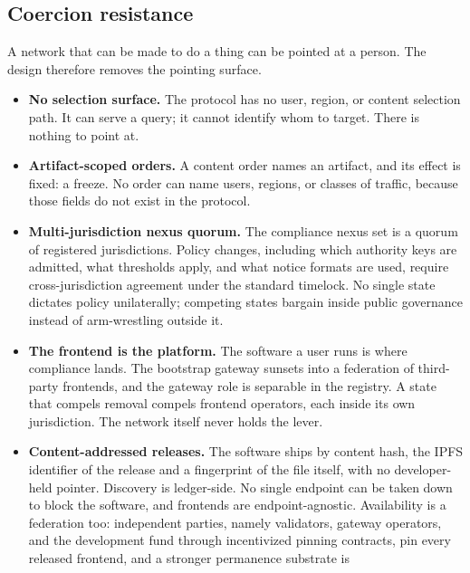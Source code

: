 \documentclass[11pt]{article}
\begin{document}
\subsection{Coercion resistance}

A network that can be made to do a thing can be pointed at a
person. The design therefore removes the pointing surface.

\begin{itemize}
    \item \textbf{No selection surface.} The protocol has no user,
          region, or content selection path. It can serve a query; it
          cannot identify whom to target. There is nothing to point at.
    \item \textbf{Artifact-scoped orders.} A content order names an
          artifact, and its effect is fixed: a freeze. No order can name
          users, regions, or classes of traffic, because those fields do
          not exist in the protocol.
    \item \textbf{Multi-jurisdiction nexus quorum.} The compliance
          nexus set is a quorum of registered jurisdictions. Policy
          changes, including which authority keys are admitted, what
          thresholds apply, and what notice formats are used, require
          cross-jurisdiction agreement under the standard timelock. No single state dictates policy
          unilaterally; competing states bargain inside public governance
          instead of arm-wrestling outside it.
    \item \textbf{The frontend is the platform.} The software a user
          runs is where compliance lands. The bootstrap gateway sunsets
          into a federation of third-party frontends, and the gateway role
          is separable in the registry. A state that compels removal
          compels frontend operators, each inside its own jurisdiction.
          The network itself never holds the lever.
    \item \textbf{Content-addressed releases.} The software ships by
          content hash, the IPFS identifier of the release and a
          fingerprint of the file itself, with no developer-held
          pointer. Discovery is ledger-side. No single endpoint can be
          taken down to block the software, and frontends are
          endpoint-agnostic. Availability is a federation too:
          independent parties, namely validators, gateway operators, and
          the development fund through incentivized pinning contracts, pin
          every released frontend, and a stronger permanence substrate is

\end{itemize}
\end{document}
